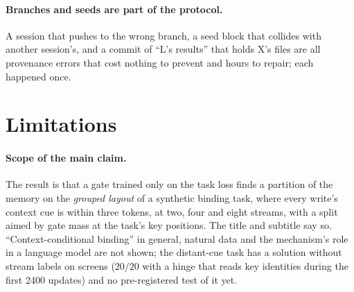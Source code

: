\documentclass[11pt]{article}
\begin{document}
\paragraph{Branches and seeds are part of the protocol.} A session that pushes to the wrong branch, a seed block that collides with another session's, and a commit of ``L's results'' that holds X's files are all provenance errors that cost nothing to prevent and hours to repair; each happened once.

\section{Limitations}
\label{sec:limits}

\paragraph{Scope of the main claim.} The result is that a gate trained only on the task loss finds a partition of the memory on the \emph{grouped layout} of a synthetic binding task, where every write's context cue is within three tokens, at two, four and eight streams, with a split aimed by gate mass at the task's key positions. The title and subtitle say so. ``Context-conditional binding'' in general, natural data and the mechanism's role in a language model are not shown; the distant-cue task has a solution without stream labels on screens ($20/20$ with a hinge that reads key identities during the first 2400 updates) and no pre-registered test of it yet.
\end{document}
